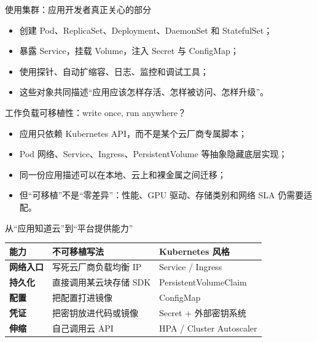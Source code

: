 \documentclass[UTF8,fontset=none,aspectratio=169,10pt]{beamer}
\begin{document}
\begin{frame}{使用集群：应用开发者真正关心的部分}
\begin{itemize}
  \item 创建 Pod、ReplicaSet、Deployment、DaemonSet 和 StatefulSet；
  \item 暴露 Service，挂载 Volume，注入 Secret 与 ConfigMap；
  \item 使用探针、自动扩缩容、日志、监控和调试工具；
  \item 这些对象共同描述“应用应该怎样存活、怎样被访问、怎样升级”。
\end{itemize}
\vfill
{}
\end{frame}

\begin{frame}{工作负载可移植性：write once, run anywhere？}
\begin{itemize}
  \item 应用只依赖 Kubernetes API，而不是某个云厂商专属脚本；
  \item Pod 网络、Service、Ingress、PersistentVolume 等抽象隐藏底层实现；
  \item 同一份应用描述可以在本地、云上和裸金属之间迁移；
  \item 但“可移植”不是“零差异”：性能、GPU 驱动、存储类别和网络 SLA 仍需要适配。
\end{itemize}
\vfill
{}
\end{frame}

\begin{frame}{从“应用知道云”到“平台提供能力”}
\begin{tabularx}{\linewidth}{>{\bfseries}p{3.2cm}XX}
\toprule
能力 & 不可移植写法 & Kubernetes 风格 \\
\midrule
网络入口 & 写死云厂商负载均衡 IP & Service / Ingress \\
持久化 & 直接调用某云块存储 SDK & PersistentVolumeClaim \\
配置 & 把配置打进镜像 & ConfigMap \\
凭证 & 把密钥放进代码或镜像 & Secret + 外部密钥系统 \\
伸缩 & 自己调用云 API & HPA / Cluster Autoscaler \\
\bottomrule
\end{tabularx}
\end{frame}

\end{document}
